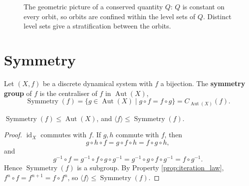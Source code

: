 \begin{figure}[htbp]
\centering
{}
\caption{The geometric picture of a conserved quantity $Q$: $Q$ is constant on every orbit, so orbits are confined within the level sets of $Q$. Distinct level sets give a stratification between the orbits.}
\label{fig:invariant_level_sets}
\end{figure}

\section{Symmetry}

\begin{definition}\label{def:symmetry_group}
Let $(X,f)$ be a discrete dynamical system with $f$ a bijection. The \textbf{symmetry group} of $f$ is the centraliser of $f$ in $\operatorname{Aut}(X)$,
\[
\operatorname{Symmetry}(f)=\{g\in\operatorname{Aut}(X)\mid g\circ f=f\circ g\}
=C_{\operatorname{Aut}(X)}(f).
\]
\end{definition}

\begin{property}\label{prop:symmetry_group_is_group}
$\operatorname{Symmetry}(f)\le\operatorname{Aut}(X)$, and $\langle f\rangle\le\operatorname{Symmetry}(f)$.
\end{property}

\begin{proof}
$\operatorname{id}_X$ commutes with $f$. If $g,h$ commute with $f$, then
\[
g\circ h\circ f=g\circ f\circ h=f\circ g\circ h,
\]
and
\[
g^{-1}\circ f=g^{-1}\circ f\circ g\circ g^{-1}
=g^{-1}\circ g\circ f\circ g^{-1}=f\circ g^{-1}.
\]
Hence $\operatorname{Symmetry}(f)$ is a subgroup. By Property \ref{prop:iteration_law}, $f^n\circ f=f^{n+1}=f\circ f^n$, so $\langle f\rangle\le\operatorname{Symmetry}(f)$.
\end{proof}

